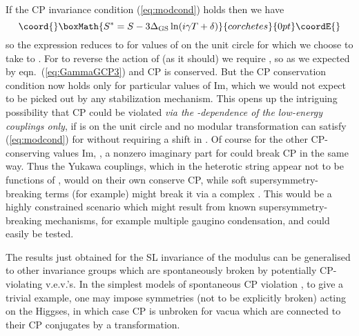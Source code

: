 \documentclass[a4paper,12pt]{article}
\begin{document}
If the CP invariance condition (\ref{eq:modcond}) holds then we have
\[\coord{}\boxMath{ S^*=S-3\Delta_{\rm GS}\ln(i\gamma T+\delta) }{corchetes}{0pt}\coordE{}\] 
so the expression \coordHE{} reduces to \coordHE{} for values of \coordHE{} on the unit circle for which we choose \coordHE{} to take \coordHE{} to \coordHE{}. For \coordHE{} to reverse the action of \coordHE{} (as it should) we require \coordHE{}, so as we expected \coordHE{} by eqn.\ (\ref{eq:GammaGCP3}) and CP is conserved. But the CP conservation condition now holds only for particular values of Im\coordHE{}, which we would not expect to be picked out by any stabilization mechanism. This opens up the intriguing possibility that CP could be violated {\em via the \coordHE{}-dependence of the low-energy couplings only}, if \coordHE{} is on the unit circle and no modular transformation can satisfy (\ref{eq:modcond}) for \coordHE{} without requiring a shift in \coordHE{}. Of course for the other CP-conserving values Im\coordHE{}, \coordHE{}, a nonzero imaginary part for \coordHE{} could break CP in the same way. Thus the Yukawa couplings, which in the heterotic string appear not to be functions of \coordHE{}, would on their own conserve CP, while soft supersymmetry-breaking terms (for example) might break it via a complex \coordHE{}. This would be a highly constrained scenario which might result from known supersymmetry-breaking mechanisms, for example multiple gaugino condensation, and could easily be tested.
   
The results just obtained for the SL\coordHE{} invariance of the \coordHE{} modulus can be generalised to other invariance groups which are spontaneously broken by potentially CP-violating v.e.v.'s. In the simplest models of spontaneous CP violation \cite{Lee_Weinberg}, to give a trivial example, one may impose \coordHE{} symmetries (not to be explicitly broken) acting on the Higgses, in which case CP is unbroken for vacua which are connected to their CP conjugates by a \coordHE{} transformation.
\end{document}
